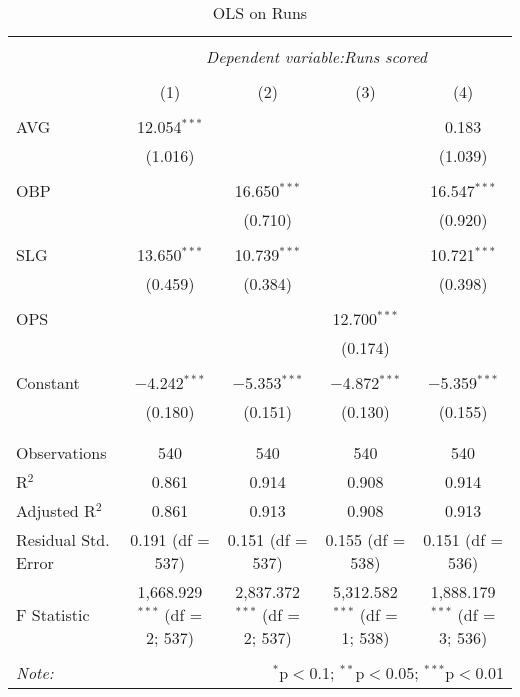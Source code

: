 
\begin{table}[!htbp] \centering
  \caption{OLS on Runs}
  \label{}
  \footnotesize
\begin{tabular}{@{\extracolsep{5pt}}lcccc}
\\[-1.8ex]\hline
\hline \\[-1.8ex]
 & \multicolumn{4}{c}{\textit{Dependent variable:Runs scored}} \\
\cline{2-5}
\\[-1.8ex] & (1) & (2) & (3) & (4)\\
\hline \\[-1.8ex]
 AVG & 12.054$^{***}$ &  &  & 0.183 \\
  & (1.016) &  &  & (1.039) \\
  & & & & \\
 OBP &  & 16.650$^{***}$ &  & 16.547$^{***}$ \\
  &  & (0.710) &  & (0.920) \\
  & & & & \\
 SLG & 13.650$^{***}$ & 10.739$^{***}$ &  & 10.721$^{***}$ \\
  & (0.459) & (0.384) &  & (0.398) \\
  & & & & \\
 OPS &  &  & 12.700$^{***}$ &  \\
  &  &  & (0.174) &  \\
  & & & & \\
 Constant & $-$4.242$^{***}$ & $-$5.353$^{***}$ & $-$4.872$^{***}$ & $-$5.359$^{***}$ \\
  & (0.180) & (0.151) & (0.130) & (0.155) \\
  & & & & \\
\hline \\[-1.8ex]
Observations & 540 & 540 & 540 & 540 \\
R$^{2}$ & 0.861 & 0.914 & 0.908 & 0.914 \\
Adjusted R$^{2}$ & 0.861 & 0.913 & 0.908 & 0.913 \\
Residual Std. Error & 0.191 (df = 537) & 0.151 (df = 537) & 0.155 (df = 538) & 0.151 (df = 536) \\
F Statistic & 1,668.929$^{***}$ (df = 2; 537) & 2,837.372$^{***}$ (df = 2; 537) & 5,312.582$^{***}$ (df = 1; 538) & 1,888.179$^{***}$ (df = 3; 536) \\
\hline
\hline \\[-1.8ex]
\textit{Note:}  & \multicolumn{4}{r}{$^{*}$p$<$0.1; $^{**}$p$<$0.05; $^{***}$p$<$0.01} \\
\end{tabular}
\end{table}
